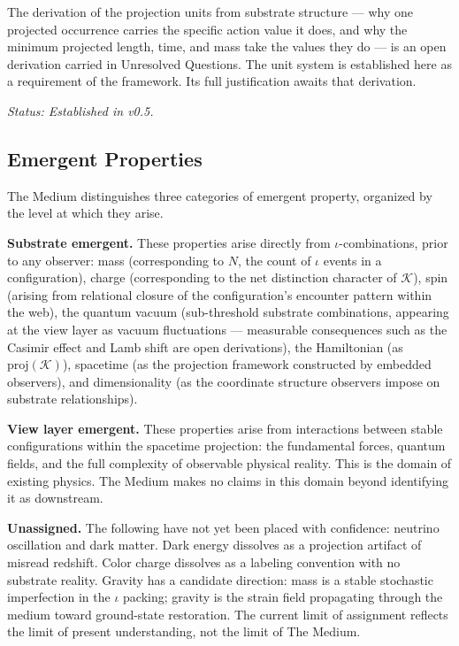 \documentclass[11pt,letterpaper]{article}
\newcommand{\Kappa}{\mathcal{K}}
\begin{document}
The derivation of the projection units from substrate structure --- why one projected occurrence carries the specific action value it does, and why the minimum projected length, time, and mass take the values they do --- is an open derivation carried in Unresolved Questions. The unit system is established here as a requirement of the framework. Its full justification awaits that derivation.

\emph{Status: Established in v0.5.}

\subsection{Emergent Properties}
\label{sec:org08a3aee}

The Medium distinguishes three categories of emergent property, organized by the level at which they arise.

\textbf{Substrate emergent.} These properties arise directly from \(\iota\)-combinations, prior to any observer: mass (corresponding to \(N\), the count of \(\iota\) events in a configuration), charge (corresponding to the net distinction character of \(\Kappa\)), spin (arising from relational closure of the configuration's encounter pattern within the web), the quantum vacuum (sub-threshold substrate combinations, appearing at the view layer as vacuum fluctuations --- measurable consequences such as the Casimir effect and Lamb shift are open derivations), the Hamiltonian (as \(\mathrm{proj}(\Kappa)\)), spacetime (as the projection framework constructed by embedded observers), and dimensionality (as the coordinate structure observers impose on substrate relationships).

\textbf{View layer emergent.} These properties arise from interactions between stable configurations within the spacetime projection: the fundamental forces, quantum fields, and the full complexity of observable physical reality. This is the domain of existing physics. The Medium makes no claims in this domain beyond identifying it as downstream.

\textbf{Unassigned.} The following have not yet been placed with confidence: neutrino oscillation and dark matter. Dark energy dissolves as a projection artifact of misread redshift. Color charge dissolves as a labeling convention with no substrate reality. Gravity has a candidate direction: mass is a stable stochastic imperfection in the \(\iota\) packing; gravity is the strain field propagating through the medium toward ground-state restoration. The current limit of assignment reflects the limit of present understanding, not the limit of The Medium.
\end{document}
